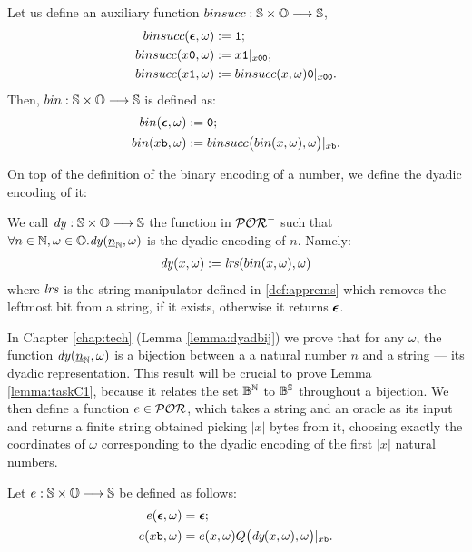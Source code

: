 \begin{defn}
Let us define an auxiliary function
$binsucc:\mathbb{S}\times \mathbb{O}\longrightarrow \mathbb{S}$,
\begin{align*}
binsucc(\bm{\epsilon},\omega) &:= {\mathtt{1}}; \\
binsucc(x\mathtt{0},\omega) &:= x\mathtt{1}|_{x\mathtt{0}\mathtt{0}}; \\
binsucc(x\mathtt{1},\omega) &:= binsucc(x,
\omega)\mathtt{0}|_{x\mathtt{0}\mathtt{0}}.
\end{align*}
Then, $bin:\mathbb{S}\times \mathbb{O} \longrightarrow \mathbb{S}$ is
defined as:
\begin{align*}
bin(\bm{\epsilon},\omega) &:= {\mathtt{0}}; \\
bin(x\mathtt{b},\omega) &:= binsucc\big(bin(x,\omega),\omega\big)|_{x\mathtt{b}}.
\end{align*}
\end{defn}
%
On top of the definition of the binary encoding of a number,
we define the dyadic encoding of it:
\begin{defn}
  We call $\mathit{dy}: \mathbb{S} \times \mathbb{O} \longrightarrow \mathbb{S}$ the function in $\mathcal{POR}^-$ such that
  $\forall n \in \mathbb{N}, \omega \in \mathbb{O}. \mathit{dy}({\underline{n}}_{\mathbb{N}}, \omega)$ is the dyadic encoding of $n$.
  Namely:
  \begin{align*}
    \mathit{dy}(x, \omega):= \mathit{lrs}(bin(x, \omega), \omega)
  \end{align*}
  where $\mathit{lrs}$ is the string manipulator defined in \ref{def:apprems} which removes
  the leftmost bit from a string, if it exists, otherwise it returns $\bm{\epsilon}$.
\end{defn}
%
In Chapter \ref{chap:tech} (Lemma \ref{lemma:dyadbij})
we prove that for any $\omega$,
the function $\mathit{dy}({\underline{n}}_{\mathbb{N}}, \omega)$
is a bijection between a a natural number $n$ and a string
--- its dyadic representation.
This result will be crucial to prove Lemma \ref{lemma:taskC1}, because it relates the set $\mathbb{B}^{\mathbb{N}}$ to $\mathbb{B}^{\mathbb{S}}$
throughout a bijection.
%
%
%
%
%
%
%
\noindent
We then define a function $e \in \mathcal{POR}$,
which takes a string and an oracle
as its input and returns a finite string obtained picking $|x|$ bytes from it,
choosing exactly the coordinates of $\omega$ corresponding to the dyadic encoding
of the first $|x|$ natural numbers.
\begin{defn}
Let $e :\mathbb{S}\times \mathbb{O} \longrightarrow \mathbb{S}$ be defined as follows:
\begin{align*}
e(\eepsilon,\omega) &= \eepsilon; \\
%
e(x\bool,\omega) &= e(x, \omega)Q\big(\dy(x,\omega),\omega\big)|_{x\bool}.
\end{align*}
\end{defn}
%
%
\noindent

